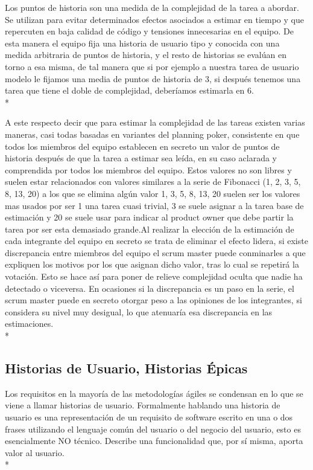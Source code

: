\documentclass[../pfc.tex]{subfiles}
\begin{document}
	Los puntos de historia son una medida de la complejidad de la tarea a abordar. Se utilizan para evitar determinados efectos asociados a estimar en tiempo y que repercuten en baja calidad de código y tensiones innecesarias en el equipo. De esta manera el equipo fija una historia de usuario tipo y conocida con una medida arbitraria de puntos de historia, y el resto de historias se evalúan en torno a esa misma, de tal manera que si por ejemplo a nuestra tarea de usuario modelo le fijamos una media de puntos de historia de 3, si después tenemos una tarea que tiene el doble de complejidad, deberíamos estimarla en 6.\\*
	
	A este respecto decir que para estimar la complejidad de las tareas existen varias maneras, casi todas basadas en variantes  del planning poker, consistente en que todos los miembros del equipo establecen en secreto un valor de puntos de historia después de que la tarea a estimar sea leída, en su caso aclarada y comprendida por todos los miembros del equipo. Estos valores no son libres y suelen estar relacionados con valores similares a la serie de Fibonacci (1, 2, 3, 5, 8, 13, 20) a los que se elimina algún valor 1, 3, 5, 8, 13, 20 suelen ser los valores mas usados por ser 1 una tarea cuasi trivial, 3 se suele asignar a la tarea base de estimación y 20 se suele usar para indicar al product owner que debe partir la tarea por ser esta demasiado grande.Al realizar la elección de la estimación de cada integrante del equipo en secreto se trata de eliminar el efecto lidera, si existe discrepancia entre miembros del equipo el scrum master puede conminarles a que expliquen los motivos por los que asignan dicho valor, tras lo cual se repetirá la votación. Esto se hace así para poner de relieve complejidad oculta que nadie ha detectado o viceversa. En ocasiones si la discrepancia es un paso en la serie, el scrum master puede en secreto otorgar peso a las opiniones de los integrantes, si considera su nivel muy desigual, lo que atenuaría esa discrepancia en las estimaciones.\\*
	
	\subsection{Historias de Usuario, Historias Épicas}
	
	Los requisitos en la mayoría de las metodologías ágiles se condensan en lo que se viene a llamar historias de usuario. Formalmente hablando una historia de usuario es una representación de un requisito de software escrito en una o dos frases utilizando el lenguaje común del usuario o del negocio del usuario, esto es esencialmente NO técnico.
	Describe una funcionalidad que, por sí misma, aporta valor al usuario.\\*
	
\end{document}
